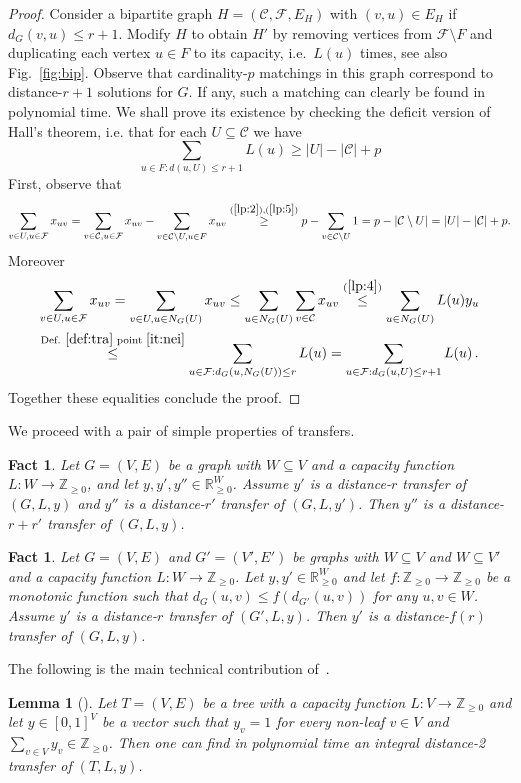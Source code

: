 \documentclass{article}
\newcommand{\F}{\mathcal{F}}
\newcommand{\C}{\mathcal{C}}
\newcommand{\pint}{\mathbb{Z}_{\ge 0}}
\newcommand{\preal}{\mathbb{R}_{\ge 0}}
\newcommand{\sub}{\subseteq}
\newcommand{\sm}{\setminus}
\theoremstyle{plain}
\newtheorem{lemma}[theorem]{Lemma}
\newtheorem{fact}[theorem]{Fact}
\theoremstyle{definition}
\begin{document}
\begin{proof}
Consider a bipartite graph $H=(\C,\F,E_H)$ with $(v,u)\in E_H$ if $d_G(v,u)\le
r+1$. Modify $H$ to obtain $H'$ by removing vertices from $\F \sm F$
and duplicating each vertex $u\in F$ to its capacity, i.e.\ $L(u)$ times, see
also Fig.~\ref{fig:bip}.
Observe that cardinality-$p$ matchings in this graph correspond to
distance-$r+1$ solutions for $G$. 
If any, such a matching can clearly be found in polynomial time.
We shall prove its existence by checking the deficit version of Hall's theorem,
i.e. that for each $U\sub \C$ we have 
$$\sum_{u\in F : d(u,U)\le r+1} L(u) \ge|U|-|\C|+p$$
First, observe that $$\sum_{v\in U, u\in \F} x_{uv} = \sum_{v\in \C, u\in \F}
x_{uv} - \sum_{v\in \C\sm U, u\in F} x_{uv} \overset{(\ref{lp:2}),(\ref{lp:5})}{\ge} p -  \sum_{v\in \C\sm U} 1 = p
- |\C\sm U| = |U|-|\C|+p.$$
Moreover
\begin{multline*}
\sum_{v\in U, u\in \F} x_{uv} = \sum_{v\in U, u\in N_G(U)}
x_{uv}\le \sum_{u\in N_G(U)}\sum_{v\in \C} x_{uv} \overset{(\ref{lp:4})}{\le}
\sum_{u\in N_G(U)} L(u)y_u\\ 
\overset{\textrm{Def.}~\ref{def:tra}\textrm{ point }\ref{it:nei}}{\le}
\sum_{u\in \F : d_G(u, N_G(U))\le r} L(u) = \sum_{u\in \F : d_G(u,U)\le r+1} L(u)\,.
\end{multline*}
Together these equalities conclude the proof.
\end{proof}

We proceed with a pair of simple properties of transfers. 
\begin{fact}\label{fct:comp}
Let $G=(V,E)$ be a graph with $W\sub V$ and a capacity function $L: W \to
\pint$, and let $y,y',y''\in \preal^W$.
Assume $y'$ is a distance-$r$ transfer of $(G,L,y)$
and $y''$ is a distance-$r'$ transfer of $(G,L,y')$. Then $y''$ is a
distance-$r+r'$ transfer of $(G,L,y)$.
\end{fact}
\begin{fact}\label{fct:image}
Let $G=(V,E)$ and $G'=(V',E')$ be graphs with $W\sub V$ and $W\sub V'$ and a
capacity function $L : W\to \pint$. Let $y,y'\in \preal^W$ and let $f : \pint\to
\pint$ be a monotonic function such that $d_G(u,v)\le f(d_{G'}(u,v))$ for any
$u,v\in W$.
Assume $y'$ is a distance-$r$ transfer of $(G',L,y)$. Then $y'$ is a
distance-$f(r)$ transfer of $(G,L,y)$.
\end{fact}

The following is the main technical contribution
of~\cite{svensson}.

\begin{lemma}[\cite{svensson}]\label{lem:tree}
Let $T=(V,E)$ be a tree with a capacity function $L:V\to \pint$ and let $y\in
[0,1]^V$ be a vector such that $y_v=1$ for every non-leaf $v\in V$ and
$\sum_{v\in V} y_v \in \pint$.
Then one can find in polynomial time an integral 
distance-2 transfer of $(T,L,y)$.
\end{lemma}
\end{document}
